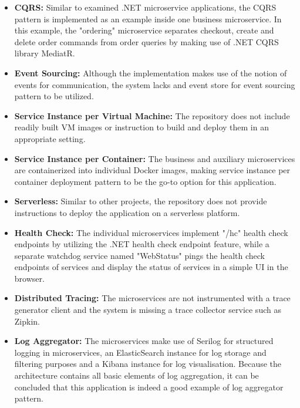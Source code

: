\documentclass{Configuration_Files/PoliMi3i_thesis}
\begin{document}
\begin{itemize}
    \item \textbf{CQRS:} Similar to examined .NET microservice applications, the CQRS pattern is implemented as an example inside one business microservice.
    In this example, the "ordering" microservice separates checkout, create and delete order commands from order queries by making use of .NET CQRS library MediatR.
    
    \item \textbf{Event Sourcing:} Although the implementation makes use of the notion of events for communication, the system lacks and event store for event sourcing pattern to be utilized.
    
    \item \textbf{Service Instance per Virtual Machine:} The repository does not include readily built VM images or instruction to build and deploy them in an appropriate setting.
    
    \item \textbf{Service Instance per Container:} The business and auxiliary microservices are containerized into individual Docker images, making service instance per container deployment pattern to be the go-to option for this application.
    
    \item \textbf{Serverless:} Similar to other projects, the repository does not provide instructions to deploy the application on a serverless platform.
    
    \item \textbf{Health Check:} The individual microservices implement "/hc" health check endpoints by utilizing the .NET health check endpoint feature, while a separate watchdog service named "WebStatus" pings the health check endpoints of services and display the status of services in a simple UI in the browser.
    
    \item \textbf{Distributed Tracing:} The microservices are not instrumented with a trace generator client and the system is missing a trace collector service such as Zipkin.
    
    \item \textbf{Log Aggregator:} The microservices make use of Serilog for structured logging in microservices, an ElasticSearch instance for log storage and filtering purposes and a Kibana instance for log visualisation.
    Because the architecture contains all basic elements of log aggregation, it can be concluded that this application is indeed a good example of log aggregator pattern.
    

\end{itemize}
\end{document}
